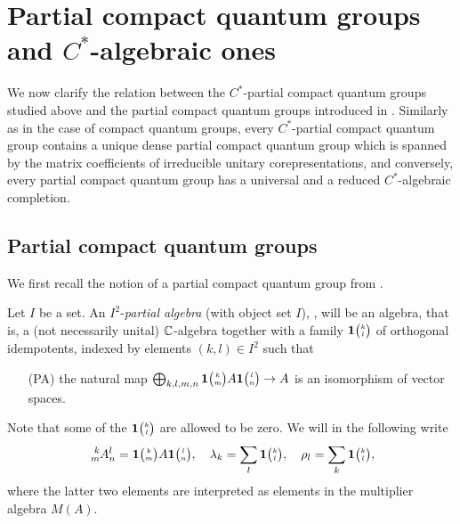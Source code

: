 \section{Partial compact quantum groups and  $C^{*}$-algebraic ones}


We now clarify the relation between the $C^{*}$-partial compact quantum groups studied above and the partial compact quantum groups introduced in \cite{DCT1}. Similarly as in the case of compact quantum groups, every $C^{*}$-partial compact quantum group contains a unique dense partial compact quantum group which is spanned  by the matrix coefficients   of irreducible unitary corepresentations, and conversely, every partial compact quantum group has a universal and a reduced $C^{*}$-algebraic completion.

\subsection{Partial compact quantum groups}

We first recall the notion of a partial compact quantum group  from \cite{DCT1}. 

Let $I$ be a set. An $I^2$-\emph{partial algebra} (with object set $I$), \cite[Definition 1.1]{DCT1}, will be an algebra, that is, a (not necessarily unital) $\mathbb{C}$-algebra together with a family $\mathbf{1}{\tiny {\begin{pmatrix} k\\l\end{pmatrix}}}$ of orthogonal idempotents, indexed by elements $(k,l)\in I^2$ such that
\begin{itemize}
\item[(PA)]  the natural map $\bigoplus_{k,l,m,n} \mathbf{1}{\tiny {\begin{pmatrix} k\\m\end{pmatrix}}}A\mathbf{1}{\tiny {\begin{pmatrix} l\\n\end{pmatrix}}} \rightarrow A$ is an isomorphism of vector spaces.
\end{itemize}
 Note that some of the $\mathbf{1}{\tiny {\begin{pmatrix} k\\l\end{pmatrix}}}$ are allowed to be zero. We will in the following write \[\Gr{A}{k}{l}{m}{n} = \UnitC{k}{m}A\UnitC{l}{n}, \quad \lambda_k = \sum_l \UnitC{k}{l},\quad \rho_l = \sum_k \UnitC{k}{l},\]  where the latter two elements are interpreted as elements in the multiplier algebra $M(A)$. 

